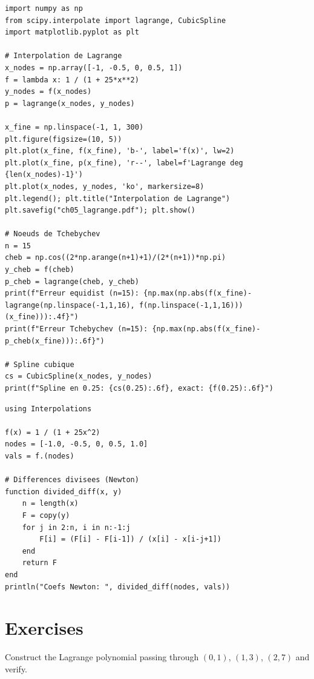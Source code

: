 \begin{codeblock}[title=\textbf{Python}]
\begin{verbatim}
import numpy as np
from scipy.interpolate import lagrange, CubicSpline
import matplotlib.pyplot as plt

# Interpolation de Lagrange
x_nodes = np.array([-1, -0.5, 0, 0.5, 1])
f = lambda x: 1 / (1 + 25*x**2)
y_nodes = f(x_nodes)
p = lagrange(x_nodes, y_nodes)

x_fine = np.linspace(-1, 1, 300)
plt.figure(figsize=(10, 5))
plt.plot(x_fine, f(x_fine), 'b-', label='f(x)', lw=2)
plt.plot(x_fine, p(x_fine), 'r--', label=f'Lagrange deg {len(x_nodes)-1}')
plt.plot(x_nodes, y_nodes, 'ko', markersize=8)
plt.legend(); plt.title("Interpolation de Lagrange")
plt.savefig("ch05_lagrange.pdf"); plt.show()

# Noeuds de Tchebychev
n = 15
cheb = np.cos((2*np.arange(n+1)+1)/(2*(n+1))*np.pi)
y_cheb = f(cheb)
p_cheb = lagrange(cheb, y_cheb)
print(f"Erreur equidist (n=15): {np.max(np.abs(f(x_fine)-lagrange(np.linspace(-1,1,16), f(np.linspace(-1,1,16)))(x_fine))):.4f}")
print(f"Erreur Tchebychev (n=15): {np.max(np.abs(f(x_fine)-p_cheb(x_fine))):.6f}")

# Spline cubique
cs = CubicSpline(x_nodes, y_nodes)
print(f"Spline en 0.25: {cs(0.25):.6f}, exact: {f(0.25):.6f}")
\end{verbatim}
\end{codeblock}

\begin{codeblock}[title=\textbf{Julia}]
\begin{verbatim}
using Interpolations

f(x) = 1 / (1 + 25x^2)
nodes = [-1.0, -0.5, 0, 0.5, 1.0]
vals = f.(nodes)

# Differences divisees (Newton)
function divided_diff(x, y)
    n = length(x)
    F = copy(y)
    for j in 2:n, i in n:-1:j
        F[i] = (F[i] - F[i-1]) / (x[i] - x[i-j+1])
    end
    return F
end
println("Coefs Newton: ", divided_diff(nodes, vals))
\end{verbatim}
\end{codeblock}

\section{Exercises}

\begin{exercise}[$\star$]
Construct the Lagrange polynomial passing through $(0,1)$, $(1,3)$, $(2,7)$ and verify.
\end{exercise}


